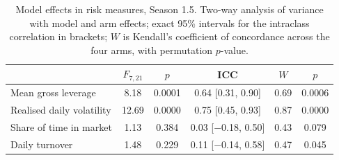 \begin{table}[ht]
\centering
\small
\caption{Model effects in risk measures, Season 1.5. Two-way analysis of variance with model and arm effects; exact 95\% intervals for the intraclass correlation in brackets; $W$ is Kendall's coefficient of concordance across the four arms, with permutation $p$-value.}
\label{tab:trait}
\begin{tabular}{lccccc}
\toprule
 & $F_{7,21}$ & $p$ & ICC & $W$ & $p$ \\
\midrule
Mean gross leverage & 8.18 & 0.0001 & 0.64 [0.31, 0.90] & 0.69 & 0.0006 \\
Realised daily volatility & 12.69 & 0.0000 & 0.75 [0.45, 0.93] & 0.87 & 0.0000 \\
Share of time in market & 1.13 & 0.384 & 0.03 [$-$0.18, 0.50] & 0.43 & 0.079 \\
Daily turnover & 1.48 & 0.229 & 0.11 [$-$0.14, 0.58] & 0.47 & 0.045 \\
\bottomrule
\end{tabular}
\end{table}

